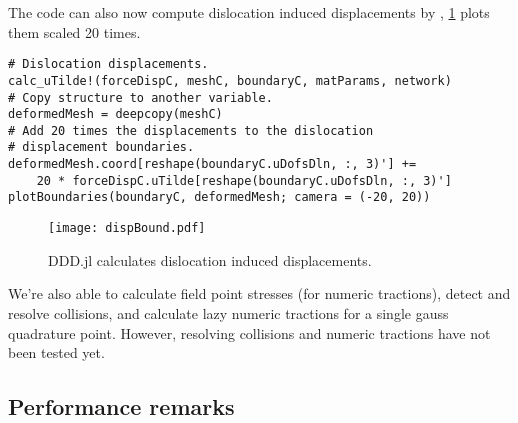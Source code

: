 The code can also now compute dislocation induced displacements by \citet{bromage2018calculating}, \cref{f:dlnDisp} plots them scaled 20 times.
\begin{verbatim}
# Dislocation displacements.
calc_uTilde!(forceDispC, meshC, boundaryC, matParams, network)
# Copy structure to another variable.
deformedMesh = deepcopy(meshC)
# Add 20 times the displacements to the dislocation 
# displacement boundaries.
deformedMesh.coord[reshape(boundaryC.uDofsDln, :, 3)'] += 
    20 * forceDispC.uTilde[reshape(boundaryC.uDofsDln, :, 3)']
plotBoundaries(boundaryC, deformedMesh; camera = (-20, 20))
\end{verbatim}
\begin{figure}
    \centering
    \texttt{[image: dispBound.pdf]}
    \caption{DDD.jl calculates dislocation induced displacements.}
    \label{f:dlnDisp}
\end{figure}
We're also able to calculate field point stresses (for numeric tractions), detect and resolve collisions, and calculate lazy numeric tractions for a single gauss quadrature point. However, resolving collisions and numeric tractions have not been tested yet.

\subsection{Performance remarks}

